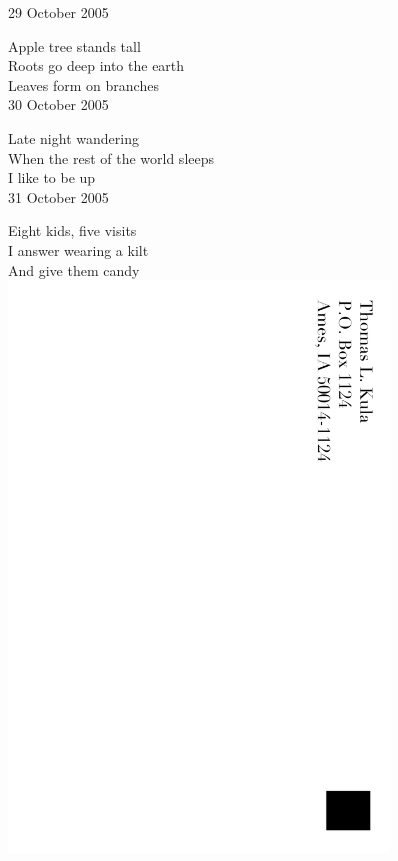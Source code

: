 \documentclass[12pt]{article}
\begin{document}
29 October 2005

Apple tree stands tall \\
Roots go deep into the earth \\
Leaves form on branches \\

30 October 2005

Late night wandering \\
When the rest of the world sleeps \\
I like to be up \\

31 October 2005

Eight kids, five visits \\
I answer wearing a kilt \\
And give them candy \\

\includegraphics[width=101mm]{backpage.png}
\end{document}
